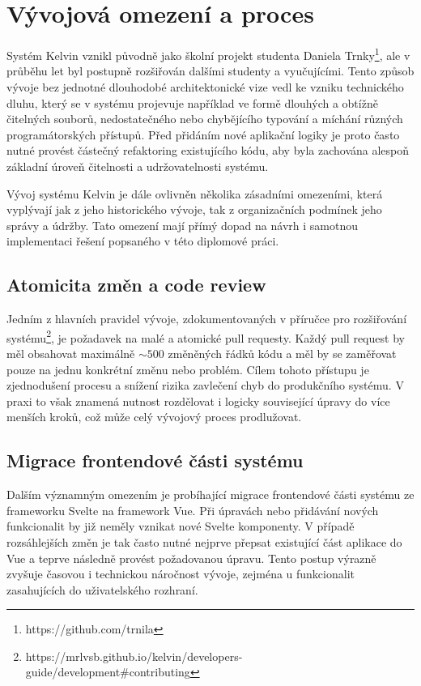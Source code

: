 \section{Vývojová omezení a proces}
\label{sec:kelvin-development}

Systém Kelvin vznikl původně jako školní projekt studenta Daniela Trnky\footnote[1]{https://github.com/trnila}, ale v průběhu let byl postupně rozšiřován dalšími studenty a vyučujícími.
Tento způsob vývoje bez jednotné dlouhodobé architektonické vize vedl ke vzniku technického dluhu, který se v systému projevuje například ve formě dlouhých a obtížně čitelných souborů, nedostatečného nebo chybějícího typování a míchání různých programátorských přístupů.
Před přidáním nové aplikační logiky je proto často nutné provést částečný refaktoring existujícího kódu, aby byla zachována alespoň základní úroveň čitelnosti a udržovatelnosti systému.

Vývoj systému Kelvin je dále ovlivněn několika zásadními omezeními, která vyplývají jak z jeho historického vývoje, tak z organizačních podmínek jeho správy a údržby.
Tato omezení mají přímý dopad na návrh i samotnou implementaci řešení popsaného v této diplomové práci.

\subsection*{Atomicita změn a code review}

Jedním z hlavních pravidel vývoje, zdokumentovaných v příručce pro rozšiřování systému\footnote{https://mrlvsb.github.io/kelvin/developers-guide/development\#contributing}, je požadavek na malé a atomické pull requesty.
Každý pull request by měl obsahovat maximálně $\sim500$ změněných řádků kódu a měl by se zaměřovat pouze na jednu konkrétní změnu nebo problém.
Cílem tohoto přístupu je zjednodušení procesu  a snížení rizika zavlečení chyb do produkčního systému.
V praxi to však znamená nutnost rozdělovat i logicky související úpravy do více menších kroků, což může celý vývojový proces prodlužovat.

\subsection*{Migrace frontendové části systému}

Dalším významným omezením je probíhající migrace frontendové části systému ze frameworku Svelte na framework Vue.
Při úpravách nebo přidávání nových funkcionalit by již neměly vznikat nové Svelte komponenty.
V případě rozsáhlejších změn je tak často nutné nejprve přepsat existující část aplikace do Vue a teprve následně provést požadovanou úpravu.
Tento postup výrazně zvyšuje časovou i technickou náročnost vývoje, zejména u funkcionalit zasahujících do uživatelského rozhraní.

